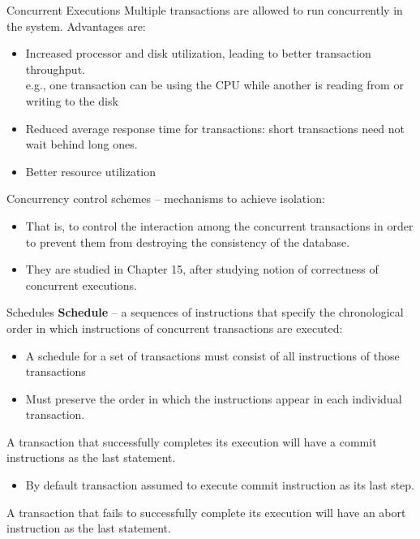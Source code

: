 \documentclass{beamer}
\begin{document}
\begin{frame}{Concurrent Executions}
    \footnotesize
    Multiple transactions are allowed to run concurrently in the system.  Advantages are:
        \begin{itemize}
            \item Increased processor and disk utilization, leading to better transaction throughput. \\        \quad e.g., one transaction can be using the CPU while another is reading from or writing to    the disk
            \item Reduced average response time for transactions: short transactions need not wait behind long ones.
            \item Better resource utilization
        \end{itemize}

    Concurrency control schemes – mechanisms to achieve isolation:
        \begin{itemize}
            \item That is, to control the interaction among the concurrent transactions in order to prevent them from destroying the consistency of the database.
            \item They are studied in Chapter 15, after studying notion of correctness of concurrent executions.
        \end{itemize}

\end{frame}

\begin{frame}{Schedules}
    \textbf{Schedule} – a sequences of instructions that specify the chronological order in which instructions of concurrent transactions are executed:
        \begin{itemize}
            \item A schedule for a set of transactions must consist of all instructions of those transactions
            \item Must preserve the order in which the instructions appear in each individual transaction.
        \end{itemize}

    A transaction that successfully completes its execution will have a commit instructions as the last statement.
        \begin{itemize}
            \item By default transaction assumed to execute commit instruction as its last step.
        \end{itemize}

    A transaction that fails to successfully complete its execution will have an abort instruction as the last statement.
\end{frame}
\end{document}
